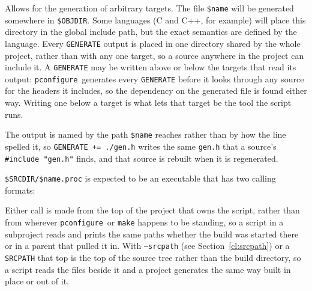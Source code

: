 \documentclass{article}
\newcommand{\pconfigure}{\texttt{pconfigure}}
\begin{document}
Allows for the generation of arbitrary targets.  The file
\texttt{\$name} will be generated somewhere in \texttt{\$OBJDIR}.
Some languages (C and C++, for example) will place this directory in
the global include path, but the exact semantics are defined by the
language.  Every \texttt{GENERATE} output is placed in one directory
shared by the whole project, rather than with any one target, so a
source anywhere in the project can include it.  A \texttt{GENERATE}
may be written above or below the targets that read its output:
\pconfigure\ generates every \texttt{GENERATE} before it looks
through any source for the headers it includes, so the dependency on
the generated file is found either way.  Writing one below a target
is what lets that target be the tool the script runs.

The output is named by the path \texttt{\$name} reaches rather than by
how the line spelled it, so \texttt{GENERATE += ./gen.h} writes the
same \texttt{gen.h} that a source's \texttt{\#include "gen.h"} finds,
and that source is rebuilt when it is regenerated.

\texttt{\$SRCDIR/\$name.proc} is expected to be an executable that has
two calling formats:

Either call is made from the top of the project that owns the script,
rather than from wherever \pconfigure\ or \texttt{make} happens to be
standing, so a script in a subproject reads and prints the same paths
whether the build was started there or in a parent that pulled it in.
With \texttt{--srcpath} (see Section~\ref{cl:srcpath}) or a
\texttt{SRCPATH} that top is the top of the source tree rather than
the build directory, so a script reads the files beside it and a
project generates the same way built in place or out of it.
\end{document}
